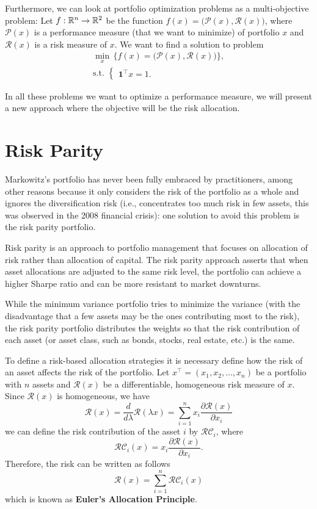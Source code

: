 Furthermore, we can look at portfolio optimization problems as a multi-objective problem: Let $f:\mathbb{R}^n\to\mathbb{R}^2$ be the function $f(x)= \big(\mathcal{P}(x), \mathcal{R}(x)\big)$, where $\mathcal{P}(x)$ is a performance measure (that we want to minimize) of portfolio $x$ and $\mathcal{R}(x)$ is a risk measure of $x$. We want to find a solution to problem
\begin{eqnarray}\label{prob:Vector}
	\min_{x} \,\Big\{f(x)= \big(\mathcal{P}(x), \mathcal{R}(x)\big)\Big\}, \\
	\mbox{s.t. }\left\{
	\begin{aligned}\nonumber
		\mathbf{1}^\top x=1.
	\end{aligned}
	\right.
\end{eqnarray}

In all these problems we want to optimize a performance measure, we will present a new approach where the objective will be the risk allocation.

\section{Risk Parity}

Markowitz’s portfolio has never been fully embraced by practitioners, among other reasons because it only considers the risk of the portfolio as a whole and ignores the diversification risk (i.e., concentrates too much risk in few assets, this was observed in the 2008 financial crisis): one solution to avoid this problem is the risk parity portfolio.

Risk parity is an approach to portfolio management that focuses on allocation of risk rather than allocation of capital. The risk parity approach asserts that when asset allocations are adjusted to the same risk level, the portfolio can achieve a higher Sharpe ratio and can be more resistant to market downturns.

While the minimum variance portfolio tries to minimize the variance (with the disadvantage that a few assets may be the ones contributing most to the risk), the risk parity portfolio distributes the weights so that the risk contribution of each asset (or asset class, such as bonds, stocks, real estate, etc.) is the same.

To define a risk-based allocation strategies it is necessary define how the risk of an asset affects the risk of the portfolio. 
Let $x^\top=(x_1,x_2,\dots,x_n)$ be a portfolio with $n$ assets and $\mathcal{R}(x)$ be a differentiable, homogeneous risk measure of $x$. Since $\mathcal{R}(x)$ is homogeneous, we have
\[
\mathcal{R}(x)=\frac{d}{d\lambda}\mathcal{R}(\lambda x)=\sum_{i=1}^n x_i \frac{\partial \mathcal{R} (x)}{\partial x_i}
\]
we can define the risk contribution of the asset $i$ by
$\mathcal{RC}_i$, where
\[
\mathcal{RC}_i(x)= x_i \frac{\partial \mathcal{R}(x)}{\partial x_i}.
\]
Therefore, the risk can be written as follows
\[
\mathcal{R}(x)=\sum_{i=1}^n \mathcal{RC}_i(x)
\]
which is known as \textbf{Euler's Allocation Principle}.


